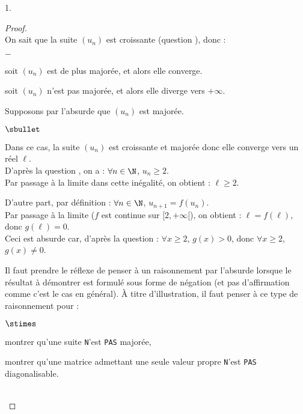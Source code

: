 \documentclass[11pt]{article}%
\begin{document}
\begin{noliste}{1.}
  \begin{proof}~\\
    On sait que la suite $(u_n)$ est croissante (question
    ), donc :
    \begin{noliste}{$-$}
    \item soit $(u_n)$ est de plus majorée, et alors elle converge.
    \item soit $(u_n)$ n'est pas majorée, et alors elle diverge vers 
      $+\infty$.
    \end{noliste}
    Supposons par l'absurde que $(u_n)$ est majorée.
    \begin{noliste}{$\sbullet$}
    \item Dans ce cas, la suite $(u_n)$ est croissante et majorée donc
      elle converge vers un réel $\ell$.\\
      D'après la question , on a : $\forall n\in\N$, $u_n
      \geq 2$.\\
      Par passage à la limite dans cette inégalité, on obtient : $\ell
      \geq 2$.
      
    \item D'autre part, par définition : $\forall n\in\N$,
      $u_{n+1}=f(u_n)$.\\
      Par passage à la limite ($f$ est continue sur $[2,+\infty[$), on
      obtient : $\ell = f(\ell)$, donc $g(\ell)=0$.\\
      Ceci est absurde car, d'après la question  : $\forall
      x\geq 2$, $g(x)>0$, donc $\forall x\geq 2$, $g(x)\neq 0$.
    \end{noliste}


    \newpage


    \begin{remark}%
      Il faut prendre le réflexe de penser à un raisonnement par
      l'absurde lorsque le résultat à démontrer est formulé sous forme
      de négation (et pas d'affirmation comme c'est le cas en
      général). À titre d'illustration, il faut penser à ce type de
      raisonnement pour :
      \begin{noliste}{$\stimes$}
      \item montrer qu'une suite {\tt N}'est {\tt PAS} majorée,
      \item montrer qu'une matrice admettant une seule valeur propre
        {\tt N}'est {\tt PAS} diagonalisable.
      \end{noliste}
    \end{remark}~\\[-1.4cm]
  \end{proof}


\end{noliste}
\end{document}
